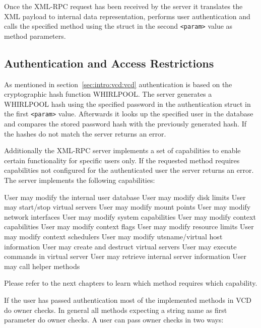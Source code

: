 Once the XML-RPC request has been received by the server it translates the XML
payload to internal data representation, performs user authentication and calls
the specified method using the struct in the second \verb,<param>, value as
method parameters.


\subsection{Authentication and Access Restrictions}

As mentioned in section~\ref{sec:intro:vcd:vcd} authentication is based on the
cryptographic hash function WHIRLPOOL. The server generates a WHIRLPOOL hash
using the specified password in the authentication struct in the first
\verb,<param>, value. Afterwards it looks up the specified user in the database
and compares the stored password hash with the previously generated hash. If
the hashes do not match the server returns an error.

Additionally the XML-RPC server implements a set of capabilities to enable
certain functionality for specific users only. If the requested method requires
capabilities not configured for the authenticated user the server returns an
error. The server implements the following capabilities:

\begin{labeling}{}
   User may modify the internal user database
   User may modify disk limits
   User may start/stop virtual servers
  User may modify mount points
    User may modify network interfaces
   User may modify system capabilities
   User may modify context capabilities
  User may modify context flags
   User may modify resource limits
  User may modify context schedulers
  User may modify utsname/virtual host information
 User may create and destruct virtual servers
   User may execute commands in virtual server
   User may retrieve internal server information
 User may call helper methods
\end{labeling}

Please refer to the next chapters to learn which method requires which
capability.

If the user has passed authentication most of the implemented methods in VCD do
owner checks. In general all methods expecting a string name as first parameter
do owner checks. A user can pass owner checks in two ways:

